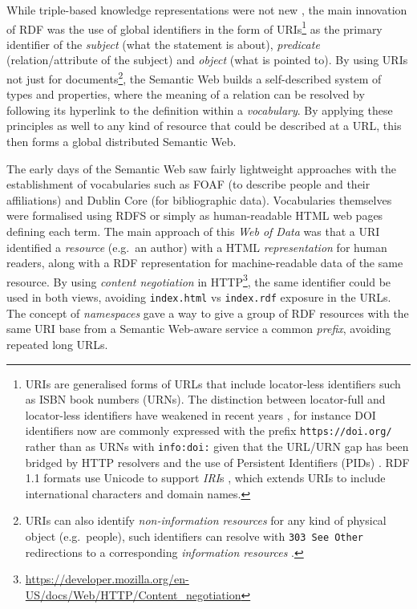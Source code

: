 \documentclass[fleqn,10pt,lineno]{wlpeerjlua}
\begin{document}
While triple-based knowledge representations were not new \autocite{stanczykProcessModellingInformation1987}, the main innovation of RDF was the use of global identifiers in the form of URIs\footnote{URIs \autocite{rfc3986} are generalised forms of URLs that include locator-less identifiers such as ISBN book numbers (URNs). The distinction between locator-full and locator-less identifiers have weakened in recent years \autocite{InfoURIRegistry}, for instance DOI identifiers now are commonly expressed with the prefix \texttt{https://doi.org/} rather than as URNs with \texttt{info:doi:} given that the URL/URN gap has been bridged by HTTP resolvers and the use of Persistent Identifiers (PIDs) \autocite{jutyIdentifiersOrgMIRIAM2011}. RDF 1.1 formats use Unicode to support \emph{IRI}s \autocite{rfc3987}, which extends URIs to include international characters and domain names.} as the primary identifier of the \emph{subject} (what the statement is about), \emph{predicate} (relation/attribute of the subject) and \emph{object} (what is pointed to). By using URIs not just for documents\footnote{URIs can also identify \emph{non-information resources} for any kind of physical object (e.g.~people), such identifiers can resolve with \texttt{303\ See\ Other} redirections to a corresponding \emph{information resources} \autocite{sauermannCoolURIsSemantic2011}.}, the Semantic Web builds a self-described system of types and properties, where the meaning of a relation can be resolved by following its hyperlink to the definition within a \emph{vocabulary}. By applying these principles as well to any kind of resource that could be described at a URL, this then forms a global distributed Semantic Web.

The early days of the Semantic Web saw fairly lightweight approaches with the establishment of vocabularies such as FOAF (to describe people and their affiliations) and Dublin Core (for bibliographic data). Vocabularies themselves were formalised using RDFS or simply as human-readable HTML web pages defining each term. The main approach of this \emph{Web of Data} was that a URI identified a \emph{resource} (e.g.~an author) with a HTML \emph{representation} for human readers, along with a RDF representation for machine-readable data of the same resource. By using \emph{content negotiation} in HTTP\footnote{\url{https://developer.mozilla.org/en-US/docs/Web/HTTP/Content_negotiation}}, the same identifier could be used in both views, avoiding \texttt{index.html} vs \texttt{index.rdf} exposure in the URLs. The concept of \emph{namespaces} gave a way to give a group of RDF resources with the same URI base from a Semantic Web-aware service a common \emph{prefix}, avoiding repeated long URLs.
\end{document}
